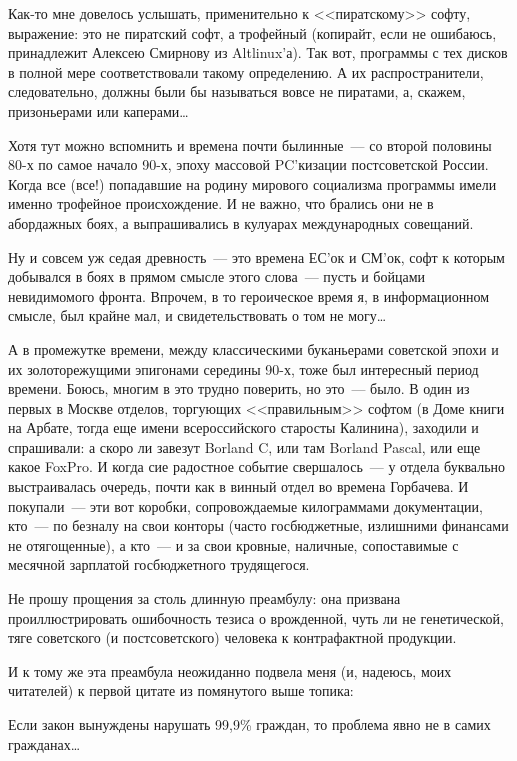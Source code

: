 Как-то мне довелось услышать, применительно к <<пиратскому>> софту, выражение: это не пиратский софт, а трофейный (копирайт, если не ошибаюсь, принадлежит Алексею Смирнову из Altlinux'а). Так вот, программы с тех дисков в полной мере соответствовали такому определению. А их распространители, следовательно, должны были бы называться вовсе не пиратами, а, скажем, призоньерами или каперами\dots

Хотя тут можно вспомнить и времена почти былинные~--- со второй половины 80-х по самое начало 90-х, эпоху массовой PC'кизации постсоветской России. Когда все (все!) попадавшие на родину мирового социализма программы имели именно трофейное происхождение. И не важно, что брались они не в абордажных боях, а выпрашивались в кулуарах международных совещаний.

Ну и совсем уж седая древность~--- это времена ЕС'ок и СМ'ок, софт к которым добывался в боях в прямом смысле этого слова~--- пусть и бойцами невидимомого фронта. Впрочем, в то героическое время я, в информационном смысле, был крайне мал, и свидетельствовать о том не могу\dots

А в промежутке времени, между классическими буканьерами советской эпохи и их золоторежущими эпигонами середины 90-х, тоже был интересный период времени. Боюсь, многим в это трудно поверить, но это~--- было. В один из первых в Москве отделов, торгующих <<правильным>> софтом (в Доме книги на Арбате, тогда еще имени всероссийского старосты Калинина), заходили и спрашивали: а скоро ли завезут Borland C, или там Borland Pascal, или еще какое FoxPro. И когда сие радостное событие свершалось~--- у отдела буквально выстраивалась очередь, почти как в винный отдел во времена Горбачева. И покупали~--- эти вот коробки, сопровождаемые килограммами документации, кто~--- по безналу на свои конторы (часто госбюджетные, излишними финансами не отягощенные), а кто~--- и за свои кровные, наличные, сопоставимые с месячной зарплатой госбюджетного трудящегося.

Не прошу прощения за столь длинную преамбулу: она призвана проиллюстрировать ошибочность тезиса о врожденной, чуть ли не генетической, тяге советского (и постсоветского) человека к контрафактной продукции.

И к тому же эта преамбула неожиданно подвела меня (и, надеюсь, моих читателей) к первой цитате из помянутого выше топика:
\begin{shadequote}{}
Если закон вынуждены нарушать 99,9\% граждан, то проблема явно не в самих гражданах\dots
\end{shadequote}

